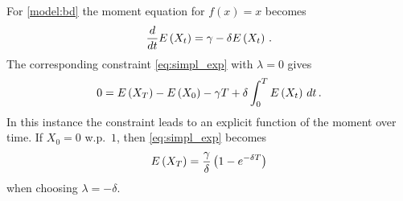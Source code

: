 \begin{example}
  For \autoref{model:bd} the moment equation for $f(x)=x$ becomes
  \[
    \frac{d}{dt}{E}\left(X_t\right)=\gamma - \delta{E}\left(X_t\right)\,.
  \]
  The corresponding constraint \eqref{eq:simpl_exp} with $\lambda=0$ gives
  \[
    0={E}\left(X_T\right) - {E}\left(X_0\right) - \gamma T + \delta \int_0^{T} {E}\left(X_t\right)\,dt\,.
  \]
  In this instance the constraint  leads to an explicit function of
  the moment over time. If  $X_0=0$ w.p.\ $1$, then \eqref{eq:simpl_exp} becomes
  \begin{equation}\label{eq:bd_constraint}
    {E}\left(X_T\right) = \frac{\gamma}{\delta} \left(1 - e^{-\delta T}\right)
  \end{equation}
  when choosing $\lambda=-\delta$.
\end{example}

